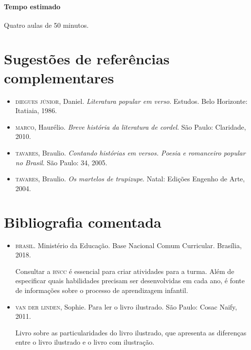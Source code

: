 \documentclass[11pt]{extarticle}
\begin{document}
\paragraph{Tempo estimado} Quatro aulas de 50 minutos.


\section{Sugestões de referências complementares}


\begin{itemize}
\item \textsc{diegues júnior}, Daniel. \textit{Literatura popular em verso}. Estudos. Belo Horizonte: Itatiaia, 1986. 

\item \textsc{marco}, Haurélio. \textit{Breve história da literatura de cordel}. São Paulo: Claridade, 2010.

\item \textsc{tavares}, Braulio. \textit{Contando histórias em versos. Poesia e romanceiro popular no Brasil}. São Paulo: 34, 2005.

\item \textsc{tavares}, Braulio. \textit{Os martelos de trupizupe}. Natal: Edições Engenho de Arte, 2004.
\end{itemize}

\section{Bibliografia comentada}


\begin{itemize}
\item \textsc{brasil}. Ministério da Educação. Base Nacional Comum Curricular. Brasília, 2018.

Consultar a \textsc{bncc} é essencial para criar atividades para a turma. Além de especificar 
quais habilidades precisam ser desenvolvidas em cada ano, é fonte de informações sobre 
o processo de aprendizagem infantil. 

 
\item \textsc{van der linden}, Sophie. Para ler o livro ilustrado. São Paulo: Cosac Naify, 2011.

Livro sobre as particularidades do livro ilustrado, que apresenta as diferenças entre o livro ilustrado e o livro com ilustração. 
\end{itemize}
\end{document}
